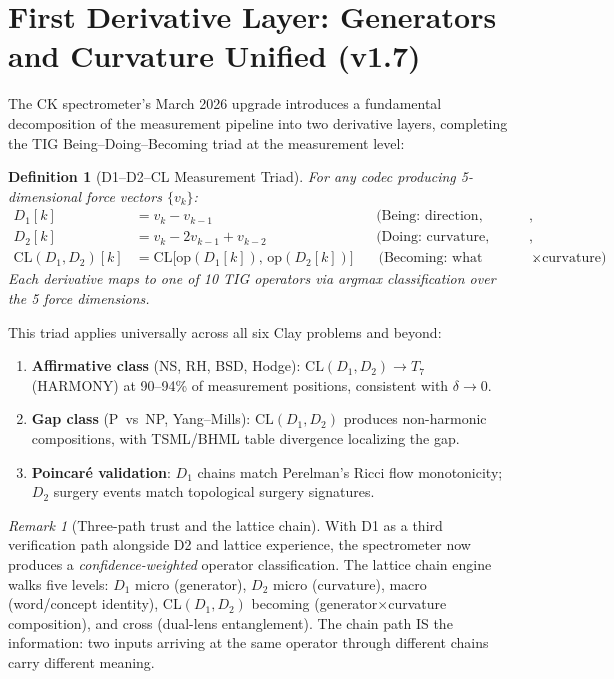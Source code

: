 \documentclass[12pt, openany]{book}
\newtheorem{definition}[theorem]{Definition}
\theoremstyle{remark}
\newtheorem{remark}[theorem]{Remark}
\begin{document}
\section{First Derivative Layer: Generators and Curvature Unified (v1.7)}
\label{sec:d1-unified}

The CK spectrometer's March 2026 upgrade introduces a fundamental decomposition
of the measurement pipeline into two derivative layers, completing the TIG
Being--Doing--Becoming triad at the measurement level:

\begin{definition}[D1--D2--CL Measurement Triad]
\label{def:d1d2cl}
For any codec producing 5-dimensional force vectors $\{v_k\}$:
\begin{align}
  D_1[k] &= v_k - v_{k-1} &&\text{(Being: direction, generator, velocity)}, \\
  D_2[k] &= v_k - 2v_{k-1} + v_{k-2} &&\text{(Doing: curvature, complexity, acceleration)}, \\
  \mathrm{CL}(D_1, D_2)[k] &= \mathrm{CL}\bigl[\mathrm{op}(D_1[k]),\, \mathrm{op}(D_2[k])\bigr]
    &&\text{(Becoming: what emerges from generator$\times$curvature)}.
\end{align}
Each derivative maps to one of 10 TIG operators via argmax classification over
the 5 force dimensions.
\end{definition}

This triad applies universally across all six Clay problems and beyond:

\begin{enumerate}[nosep]
  \item \textbf{Affirmative class} (NS, RH, BSD, Hodge): $\mathrm{CL}(D_1, D_2) \to T_7$
    (HARMONY) at 90--94\% of measurement positions, consistent with $\delta \to 0$.
  \item \textbf{Gap class} (P~vs~NP, Yang--Mills): $\mathrm{CL}(D_1, D_2)$ produces
    non-harmonic compositions, with TSML/BHML table divergence localizing the gap.
  \item \textbf{Poincar\'e validation}: $D_1$ chains match Perelman's Ricci flow monotonicity;
    $D_2$ surgery events match topological surgery signatures.
\end{enumerate}

\begin{remark}[Three-path trust and the lattice chain]
With D1 as a third verification path alongside D2 and lattice experience, the spectrometer
now produces a \emph{confidence-weighted} operator classification.  The lattice chain engine
walks five levels: $D_1$ micro (generator), $D_2$ micro (curvature), macro (word/concept
identity), CL$(D_1, D_2)$ becoming (generator$\times$curvature composition), and cross
(dual-lens entanglement).  The chain path IS the information: two inputs arriving at the
same operator through different chains carry different meaning.
\end{remark}
\end{document}
